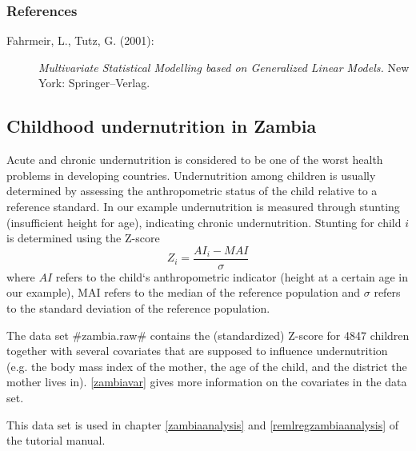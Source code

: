 \subsubsection*{References}

\begin{description}
\item [Fahrmeir, L., Tutz, G. (2001):] {\it Multivariate Statistical
Modelling based on Generalized Linear Models.} New York:
Springer--Verlag.
\end{description}

\subsection{Childhood undernutrition in Zambia}
\label{zambia}  

Acute and chronic undernutrition is considered to be one of the
worst health problems in developing countries. Undernutrition
among children is usually determined by assessing the
anthropometric status of the child relative to a reference
standard. In our example undernutrition is measured through
stunting (insufficient height for age), indicating chronic
undernutrition. Stunting for child $i$ is determined using the
Z-score
\[Z_i = \frac{AI_i-MAI}{\sigma}\]
where $AI$ refers to the child`s anthropometric indicator (height
at a certain age in our example), MAI refers to the median of the
reference population and $\sigma$ refers to the standard deviation
of the reference population.

The data set #zambia.raw# contains the (standardized) Z-score for
4847 children together with several covariates that are supposed
to influence undernutrition (e.g. the body mass index of the
mother, the age of the child, and the district the mother lives
in). \autoref{zambiavar} gives more information on the covariates
in the data set.

This data set is used in chapter \ref*{zambiaanalysis} and
\ref*{remlregzambiaanalysis} of the tutorial manual.

